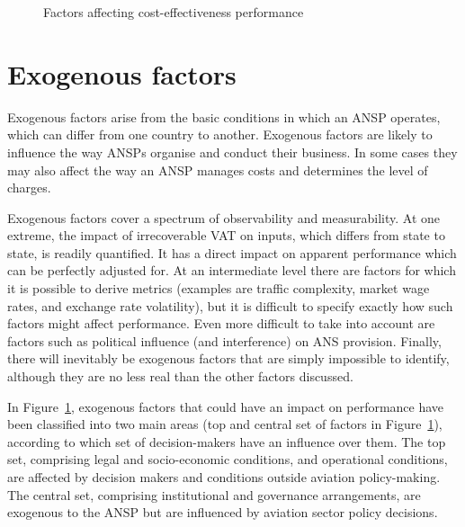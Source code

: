 \documentclass[
  11pt,
  a4paperpaper,
  openany,headsepline=on,footsepline=off,DIV=12,table]{scrbook}
\begin{document}
\begin{figure}


\caption{\label{fig-factors-cost}Factors affecting cost-effectiveness
performance}

\end{figure}%

\section{Exogenous factors}\label{exogenous-factors}

Exogenous factors arise from the basic conditions in which an ANSP
operates, which can differ from one country to another. Exogenous
factors are likely to influence the way ANSPs organise and conduct their
business. In some cases they may also affect the way an ANSP manages
costs and determines the level of charges.

Exogenous factors cover a spectrum of observability and measurability.
At one extreme, the impact of irrecoverable VAT on inputs, which differs
from state to state, is readily quantified. It has a direct impact on
apparent performance which can be perfectly adjusted for. At an
intermediate level there are factors for which it is possible to derive
metrics (examples are traffic complexity, market wage rates, and
exchange rate volatility), but it is difficult to specify exactly how
such factors might affect performance. Even more difficult to take into
account are factors such as political influence (and interference) on
ANS provision. Finally, there will inevitably be exogenous factors that
are simply impossible to identify, although they are no less real than
the other factors discussed.

In Figure~\ref{fig-factors-cost}, exogenous factors that could have an
impact on performance have been classified into two main areas (top and
central set of factors in Figure~\ref{fig-factors-cost}), according to
which set of decision-makers have an influence over them. The top set,
comprising legal and socio-economic conditions, and operational
conditions, are affected by decision makers and conditions outside
aviation policy-making. The central set, comprising institutional and
governance arrangements, are exogenous to the ANSP but are influenced by
aviation sector policy decisions.
\end{document}
